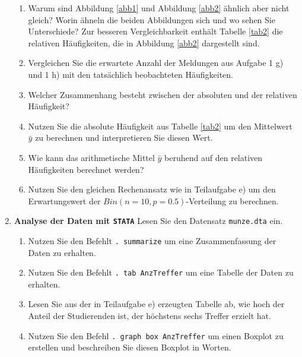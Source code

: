 \documentclass[11pt]{article}
\newcommand{\aufgabe}[1]{\item{\bf #1}}
\begin{document}
\begin{enumerate}
\begin{enumerate}
\item{Warum sind Abbildung \ref{abb1} und Abbildung \ref{abb2} ähnlich aber nicht gleich? Worin ähneln die beiden Abbildungen sich
und wo sehen Sie Unterschiede? Zur besseren Vergleichbarkeit enthält Tabelle \ref{tab2} die relativen Häufigkeiten, die in Abbildung
\ref{abb2} dargestellt sind.}
\item{Vergleichen Sie die erwartete Anzahl der Meldungen aus  Aufgabe 1 g) und 1 h) mit den tatsächlich beobachteten Häufigkeiten.}
\item{Welcher Zusammenhang besteht zwischen der absoluten und der relativen Häufigkeit?}
\item{Nutzen Sie die absolute Häufigkeit aus Tabelle \ref{tab2} um den Mittelwert $\bar{y}$ zu berechnen und interpretieren Sie diesen Wert.}
\item{Wie kann das arithmetische Mittel $\bar{y}$ beruhend auf den relativen Häufigkeiten berechnet werden?}
\item{Nutzen Sie den gleichen Rechenansatz wie in Teilaufgabe e) um den Erwartungswert der $Bin(n=10,p=0.5)$-Verteilung zu berechnen.}
\end{enumerate}
\newpage
\aufgabe{Analyse der Daten mit \texttt{STATA}} %
Lesen Sie den Datensatz \texttt{munze.dta} ein.
\begin{enumerate}
\item{Nutzen Sie den Befehlt \texttt{. summarize} um eine Zusammenfassung der Daten zu erhalten.}
\item{Nutzen Sie den Befehlt \texttt{. tab AnzTreffer} um eine Tabelle der Daten zu erhalten.}
\item{Lesen Sie aus der in Teilaufgabe e) erzeugten Tabelle ab, wie hoch der Anteil der Studierenden ist,
der höchstens sechs Treffer erzielt hat.}
\item{Nutzen Sie den Befehl  \texttt{. graph box AnzTreffer} um einen Boxplot zu erstellen und beschreiben Sie diesen Boxplot in Worten.}
\end{enumerate}

\end{enumerate}
\end{document}

